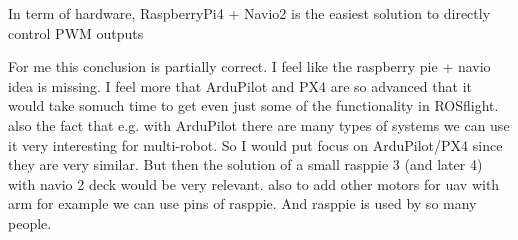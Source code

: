         In term of hardware, RaspberryPi4 + Navio2 is the easiest solution to directly control PWM outputs 
        
        {\color{red}For me this conclusion is partially correct. I feel like the raspberry pie + navio idea is missing. }
        {\color{red}I feel more that ArduPilot and PX4 are so advanced that it would take somuch time to get even just some of the functionality in ROSflight. also the fact that e.g. with ArduPilot there are many types of systems we can use it very interesting for multi-robot. So I would put focus on ArduPilot/PX4 since they are very similar. But then the solution of a small rasppie 3 (and later 4) with navio 2 deck would be very relevant. also to add other motors for uav with arm for example we can use pins of rasppie. And rasppie is used by so many people.}